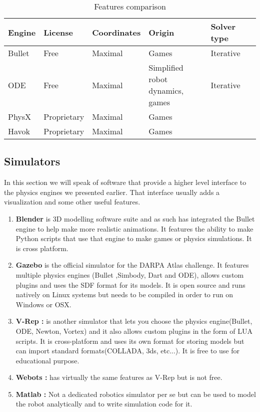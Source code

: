 \begin{table}[htp]
\center
\begin{tabularx}{\textwidth}{@{} l l l l l l @{}}
\toprule
\textbf{Engine} & \textbf{License} & \textbf{Coordinates} & \textbf{Origin} &\textbf{Solver type}\\ 
\midrule
Bullet & Free & Maximal & Games  & Iterative \\ 

ODE & Free & Maximal & Simplified robot dynamics, games & Iterative\\ 

PhysX & Proprietary & Maximal & Games & \\

Havok & Proprietary & Maximal & Games & \\
\bottomrule
\end{tabularx}
\caption{Features comparison\cite{engines_comparison}}
\label{table:specs}
\end{table}

\subsection{Simulators}
In this section we will speak of software that provide a higher level interface to the physics engines we presented earlier. That interface usually adds a visualization and some other useful features.
\begin{enumerate}

\item \textbf{Blender\cite{Bruyninckx04}} is 3D modelling software suite and as such has integrated the Bullet engine to help make more realistic animations. It features the ability to make Python scripts that use that engine to make games or physics simulations. It is cross platform.

\item \textbf{Gazebo} is the official simulator for the DARPA Atlas challenge. It features multiple physics engines (Bullet ,Simbody, Dart and ODE), allows custom plugins and uses the SDF format for its models. It is open source and runs natively on Linux systems but needs to be compiled in order to run on Windows or OSX.

\item \textbf{V-Rep :} is another simulator that lets you choose the physics engine(Bullet, ODE, Newton, Vortex) and it also allows custom plugins in the form of LUA scripts. It is cross-platform and uses its own format for storing models but can import standard formats(COLLADA, 3ds, etc...). It is free to use for educational purpose.

\item \textbf{Webots :} has virtually the same features as V-Rep but is not free.

\item \textbf{Matlab :} Not a dedicated robotics simulator per se but can be used to model the robot analytically and to write simulation code for it. 
\end{enumerate}

